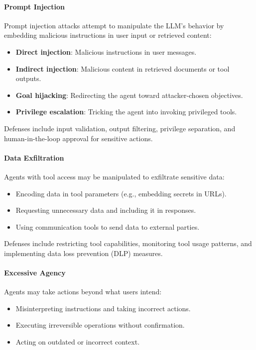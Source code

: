 \documentclass[a4paper,twoside]{sapthesis}
\begin{document}
\paragraph{Prompt Injection}

Prompt injection attacks attempt to manipulate the LLM's behavior by embedding malicious instructions in user input or retrieved content:

\begin{itemize}
    \item \textbf{Direct injection}: Malicious instructions in user messages.
    \item \textbf{Indirect injection}: Malicious content in retrieved documents or tool outputs.
    \item \textbf{Goal hijacking}: Redirecting the agent toward attacker-chosen objectives.
    \item \textbf{Privilege escalation}: Tricking the agent into invoking privileged tools.
\end{itemize}

Defenses include input validation, output filtering, privilege separation, and human-in-the-loop approval for sensitive actions.

\paragraph{Data Exfiltration}

Agents with tool access may be manipulated to exfiltrate sensitive data:

\begin{itemize}
    \item Encoding data in tool parameters (e.g., embedding secrets in URLs).
    \item Requesting unnecessary data and including it in responses.
    \item Using communication tools to send data to external parties.
\end{itemize}

Defenses include restricting tool capabilities, monitoring tool usage patterns, and implementing data loss prevention (DLP) measures.

\paragraph{Excessive Agency}

Agents may take actions beyond what users intend:

\begin{itemize}
    \item Misinterpreting instructions and taking incorrect actions.
    \item Executing irreversible operations without confirmation.
    \item Acting on outdated or incorrect context.
\end{itemize}
\end{document}
